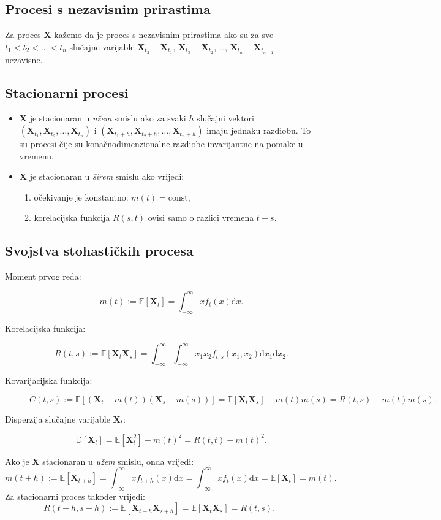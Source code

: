 \documentclass[12pt,english]{article}
\begin{document}
\subsection{Procesi s nezavisnim prirastima}
Za proces $\mathbf X$ kažemo da je proces s nezavisnim prirastima ako su za sve $t_1 < t_2 < \ldots < t_n$ slučajne varijable $\mathbf X_{t_2} - \mathbf X_{t_1}$, $\mathbf X_{t_3} - \mathbf X_{t_2}$, \ldots, $\mathbf X_{t_n} - \mathbf X_{t_{n-1}}$ nezavisne.

\subsection{Stacionarni procesi}
\begin{itemize}
  \item $\mathbf X$ je stacionaran u \emph{užem} smislu ako za svaki $h$ slučajni vektori $\left( \mathbf X_{t_1}, \mathbf X_{t_2}, \ldots, \mathbf X_{t_n}\right)$ i  $\left( \mathbf X_{t_1+h}, \mathbf X_{t_2+h}, \ldots, \mathbf X_{t_n+h}\right)$ imaju jednaku razdiobu. To su procesi čije su konačnodimenzionalne razdiobe invarijantne na pomake u vremenu.

  \item $\mathbf X$ je stacionaran u \emph{širem} smislu ako vrijedi:
  \begin{enumerate}
    \item očekivanje je konstantno: $m(t) = \text{const}$,
    \item korelacijska funkcija $R(s,t)$ ovisi samo o razlici vremena $t-s$.
  \end{enumerate}
\end{itemize}

\subsection{Svojstva stohastičkih procesa}
\begin{description}
  \item[Moment prvog reda:]
  $$m(t) := \mathbb E\left[ \mathbf X_t\right] = \int_{-\infty}^\infty xf_t(x)\mathrm{d}x.$$
  \item[Korelacijska funkcija:]
  $$R(t,s) := \mathbb E\left[\mathbf X_t \mathbf X_s\right] = \int_{-\infty}^\infty \int_{-\infty}^\infty x_1x_2f_{t,s}(x_1,x_2)\mathrm dx_1\mathrm dx_2.$$
  \item[Kovarijacijska funkcija:]
  $$C(t,s) := \mathbb E\left[(\mathbf X_t - m(t))(\mathbf X_s-m(s))\right] = \mathbb E\left[\mathbf X_t\mathbf X_s\right] -m(t)m(s) = R(t,s)-m(t)m(s).$$
  \item[Disperzija slučajne varijable $\mathbf X_t$:]
  $$\mathbb D\left[\mathbf X_t\right] = \mathbb E\left[\mathbf X_t^2\right] - m(t)^2 = R(t,t) - m(t)^2.$$
\end{description}
Ako je $\mathbf X$ stacionaran u \emph{užem} smislu, onda vrijedi:
  $$m(t+h) := \mathbb E\left[ \mathbf X_{t+h}\right] = \int_{-\infty}^\infty xf_{t+h}(x)\mathrm{d}x = \int_{-\infty}^\infty xf_{t}(x)\mathrm{d}x = \mathbb E\left[\mathbf X_t\right] = m(t).$$
Za stacionarni proces također vrijedi:
$$R(t+h,s+h) := \mathbb E\left[\mathbf X_{t+h} \mathbf X_{s+h}\right] = \mathbb E\left[\mathbf X_t \mathbf X_s\right] = R(t,s).$$
\end{document}

